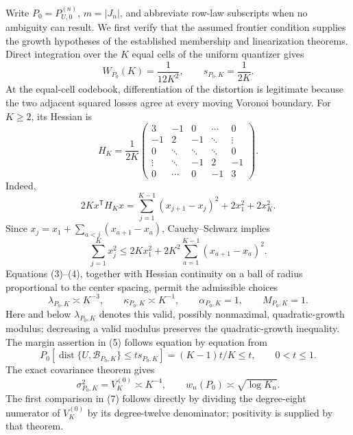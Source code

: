 Write \(P_0=P_{U,0}^{(n)}\), \(m=|J_n|\), and abbreviate row-law subscripts when no ambiguity can result.  We first verify that the assumed frontier condition supplies the growth hypotheses of the established membership and linearization theorems.  Direct integration over the \(K\) equal cells of the uniform quantizer gives
\[
 W_{P_0}(K)=\frac{1}{12K^2},\qquad s_{P_0,K}=\frac{1}{2K}.
 \tag{1}
\]
At the equal-cell codebook, differentiation of the distortion is legitimate because the two adjacent squared losses agree at every moving Voronoi boundary.  For \(K\geq2\), its Hessian is
\[
 H_K=\frac{1}{2K}
 \begin{pmatrix}
 3&-1&0&\cdots&0\\
 -1&2&-1&\ddots&\vdots\\
 0&\ddots&\ddots&\ddots&0\\
 \vdots&\ddots&-1&2&-1\\
 0&\cdots&0&-1&3
 \end{pmatrix}.
 \tag{2}
\]
Indeed,
\[
 2Kx^{\mathsf T}H_Kx
 =\sum_{j=1}^{K-1}(x_{j+1}-x_j)^2+2x_1^2+2x_K^2.
 \tag{3}
\]
Since \(x_j=x_1+\sum_{a<j}(x_{a+1}-x_a)\), Cauchy--Schwarz implies
\[
 \sum_{j=1}^Kx_j^2
 \leq 2Kx_1^2+2K^2\sum_{a=1}^{K-1}(x_{a+1}-x_a)^2.
 \tag{4}
\]
Equations (3)--(4), together with Hessian continuity on a ball of radius proportional to the center spacing, permit the admissible choices
\[
 \lambda_{P_0,K}\asymp K^{-3},\qquad
 \kappa_{P_0,K}\asymp K^{-1},\qquad
 \alpha_{P_0,K}=1,\qquad M_{P_0,K}=1.
 \tag{5}
\]
Here and below \(\lambda_{P_0,K}\) denotes this valid, possibly nonmaximal, quadratic-growth modulus; decreasing a valid modulus preserves the quadratic-growth inequality.  The margin assertion in (5) follows equation by equation from
\[
 P_0\!\left[\operatorname{dist}\{U,\mathcal B_{P_0,K}\}\leq t s_{P_0,K}\right]
 =(K-1)t/K\leq t,\qquad 0<t\leq1.
 \tag{6}
\]
The exact covariance theorem gives
\[
 \sigma_{P_0,K}^2=V_K^{(0)}\asymp K^{-4},\qquad
 w_n(P_0)\asymp\sqrt{\log K_n}.
 \tag{7}
\]
The first comparison in (7) follows directly by dividing the degree-eight numerator of \(V_K^{(0)}\) by its degree-twelve denominator; positivity is supplied by that theorem.

